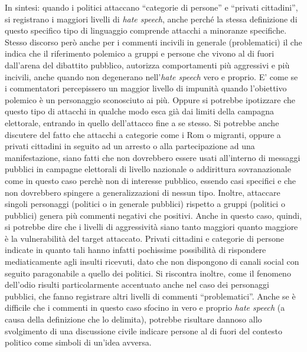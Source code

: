 In sintesi: quando i politici attaccano “categorie di persone” e “privati cittadini”, si registrano i maggiori livelli di \textit{hate speech}, anche perché la stessa definizione di questo specifico tipo di linguaggio comprende attacchi a minoranze specifiche. Stesso discorso però anche per i commenti incivili in generale (problematici) il che indica che il riferimento polemico a gruppi e persone che vivono al di fuori dall’arena del dibattito pubblico, autorizza comportamenti più aggressivi e più incivili, anche quando non degenerano nell’\textit{hate speech} vero e proprio. E’ come se i commentatori percepissero un maggior livello di impunità quando l’obiettivo polemico è un personaggio sconosciuto ai più. Oppure si potrebbe ipotizzare che questo tipo di attacchi in qualche modo esca già dai limiti della campagna elettorale, entrando in quello dell’attacco fine a se stesso. Si potrebbe anche discutere del fatto che attacchi a categorie come i Rom o migranti, oppure a privati cittadini in seguito ad un arresto o alla partecipazione ad una manifestazione, siano fatti che non dovrebbero essere usati all’interno di messaggi pubblici in campagne elettorali di livello nazionale o addirittura sovranazionale come in questo caso perchè non di interesse pubblico, essendo casi specifici e che non dovrebbero spingere a generalizzazioni di nessun tipo.
Inoltre, attaccare singoli personaggi (politici o in generale pubblici) rispetto a gruppi (politici o pubblici) genera più commenti negativi che positivi. Anche in questo caso, quindi, si potrebbe dire che i livelli di aggressività siano tanto maggiori quanto maggiore è la vulnerabilità del target attaccato. Privati cittadini e categorie di persone indicate in quanto tali hanno infatti pochissime possibilità di rispondere mediaticamente agli insulti ricevuti, dato che non dispongono di canali social con seguito paragonabile a quello dei politici.
Si riscontra inoltre, come il fenomeno dell'odio risulti particolarmente accentuato anche nel caso dei personaggi pubblici, che fanno registrare altri livelli di commenti “problematici”. Anche se è difficile che i commenti in questo caso sfocino in vero e proprio \textit{hate speech} (a causa della definizione che lo delimita), potrebbe risultare dannoso allo svolgimento di una discussione civile indicare persone al di fuori del contesto politico come simboli di un’idea avversa.
